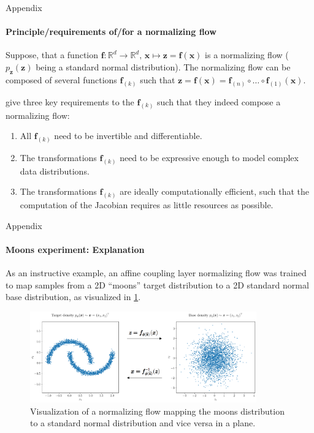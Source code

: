 \documentclass{beamer}
\newcommand\vect[1]{\ensuremath{\bm{#1}}}
\begin{document}
\begin{frame}[allowframebreaks]{Appendix}
	\framesubtitle{Principle/requirements of/for a normalizing flow}
	Suppose, that a function $\vect{f}: \mathbb{R}^d \rightarrow \mathbb{R}^d, \,\vect{x} \mapsto \vect{z} = \vect{f}(\vect{x})$ is a normalizing flow ($p_{\vect{z}}(\vect{z})$ being a standard normal distribution). The normalizing flow can be composed of several functions $\vect{f}_{(k)}$ such that $\vect{z} = \vect{f}(\vect{x}) = \vect{f}_{(n)} \circ \dots \circ \vect{f}_{(1)}(\vect{x})$.
	
	\cite{Kobyzev.2021} give three key requirements to the $\vect{f}_{(k)}$ such that they indeed compose a normalizing flow:
	\begin{enumerate}
		\item All $\vect{f}_{(k)}$ need to be invertible and differentiable.
		\item The transformations $\vect{f}_{(k)}$ need to be expressive enough to model complex data distributions.
		\item The transformations $\vect{f}_{(k)}$ are ideally computationally efficient, such that the computation of the Jacobian requires as little resources as possible.
	\end{enumerate}
\end{frame}

\begin{frame}[allowframebreaks]{Appendix}
	\framesubtitle{Moons experiment: Explanation}
	As an instructive example, an affine coupling layer normalizing flow was trained to map samples from a 2D ``moons'' target distribution to a 2D standard normal base distribution, as visualized in \cref{fig:target-to-base}.
	
	\begin{figure}
		\centering
		\includegraphics[width=0.87\textwidth]{figures/thesis/target-to-base.pdf}
		\caption{Visualization of a normalizing flow mapping the moons distribution to a standard normal distribution and vice versa in a plane.}
		\label{fig:target-to-base}
	\end{figure}
\end{frame}
\end{document}
